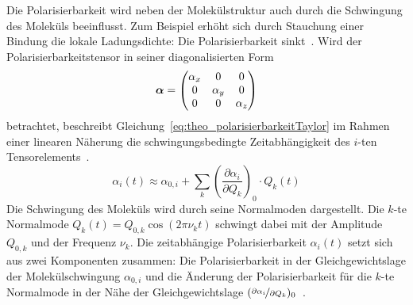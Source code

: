 \documentclass[a4paper,12pt,twoside,parskip=no,headsepline,open=right,ngerman,export]{scrreprt}
\begin{document}
            Die Polarisierbarkeit wird neben der Molekülstruktur auch durch die Schwingung des Moleküls beeinflusst. Zum Beispiel erhöht sich durch Stauchung einer Bindung die lokale Ladungsdichte: Die Polarisierbarkeit sinkt~\cite{chalmers_raman_2006}. Wird der Polarisierbarkeitstensor in seiner diagonalisierten Form 
            \begin{equation}
                \boldsymbol\alpha = \begin{pmatrix}   \alpha_x  & 0         & 0 \\
                                                0         & \alpha_y  & 0 \\
                                                0         & 0         & \alpha_z
                              \end{pmatrix}
            \end{equation}
            betrachtet, beschreibt Gleichung~\ref{eq:theo_polarisierbarkeitTaylor} im Rahmen einer linearen Näherung die schwingungsbedingte Zeitabhängigkeit des $i$-ten Tensorelements~\cite{wilson_molecular_1955}.
            \begin{equation}
                \alpha_i(t) \approx \alpha_{0,i} + \sum_k \left(\frac{\partial \alpha_i}{\partial Q_k}\right)_0 \cdot Q_k(t)
                \label{eq:theo_polarisierbarkeitTaylor}
            \end{equation}
            Die Schwingung des Moleküls wird durch seine Normalmoden dargestellt. Die $k$-te Normalmode $Q_k(t) = Q_{0,k} \cos(2\pi \nu_k t)$ schwingt dabei mit der Amplitude $Q_{0,k}$ und der Frequenz $\nu_k$. Die zeitabhängige Polarisierbarkeit $\alpha_i(t)$ setzt sich aus zwei Komponenten zusammen: Die Polarisierbarkeit in der Gleichgewichtslage der Molekülschwingung $\alpha_{0,i}$ und die Änderung der Polarisierbarkeit für die $k$-te Normalmode in der Nähe der Gleichgewichtslage $(\nicefrac{\partial \alpha_i}{\partial Q_k})_0$~\cite{wilson_molecular_1955}.
            
\end{document}
